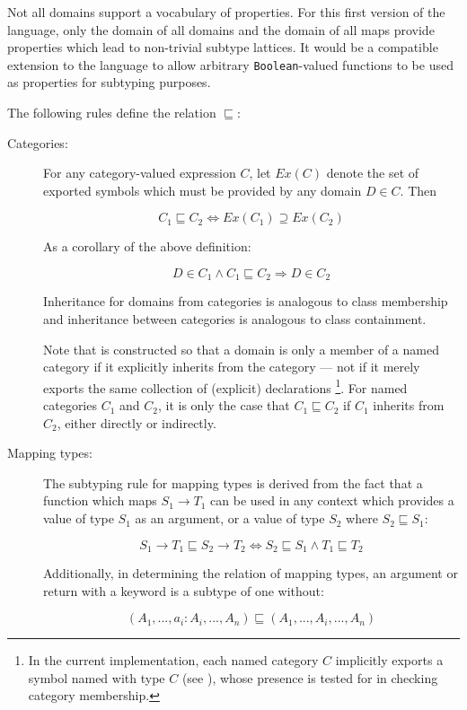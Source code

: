 Not all domains support a vocabulary of properties.
For this first version of the language, only the domain of all domains
and the domain of all maps provide properties which lead to non-trivial
subtype lattices.  It would be a compatible extension to the language
to allow arbitrary {\tt Boolean}-valued functions to be used as
properties for subtyping purposes.

The following rules define the relation $\sqsubseteq$:
\begin{description}

\item[Categories:]
For any category-valued expression $C$, let $Ex(C)$ denote the set
of exported symbols which must be provided by any domain $D \in C$.
Then

$$ C_1 \sqsubseteq C_2 \iff Ex(C_1) \supseteq Ex(C_2) $$

As a corollary of the above definition:

$$ D \in C_1 \wedge C_1 \sqsubseteq C_2 \Rightarrow D \in C_2 $$

Inheritance for domains from categories is analogous to class membership
and inheritance between categories is analogous to class containment.

Note that \asharp{} is constructed so that a domain is only a member of
a named category if it explicitly inherits from the category --- not if
it merely exports the same collection of (explicit) declarations%
\footnote{In the current implementation, each named category $C$
implicitly exports a symbol named \ttin{\%\%} with type $C$ (see
), whose presence is tested for in
checking category membership.}.  For named categories $C_1$ and $C_2$,
it is only the case that $C_1 \sqsubseteq C_2$ if $C_1$ inherits from
$C_2$, either directly or indirectly.

\item[Mapping types:]

The subtyping rule for mapping types is derived from the fact that a function
which maps $S_1 \rightarrow T_1$ can be used in any context which provides
a value of type $S_1$ as an argument, or a value of type $S_2$ where
$S_2 \sqsubseteq S_1$:

$$ S_1 \rightarrow T_1 \sqsubseteq S_2 \rightarrow T_2 \iff
   S_2 \sqsubseteq S_1 \wedge T_1 \sqsubseteq T_2 $$

Additionally, in determining the relation of mapping types,
an argument or return with a keyword is a subtype of one without:

$$ (A_1, ... , a_i: A_i, ..., A_n) \sqsubseteq (A_1, ... , A_i, ..., A_n) $$
\end{description}


